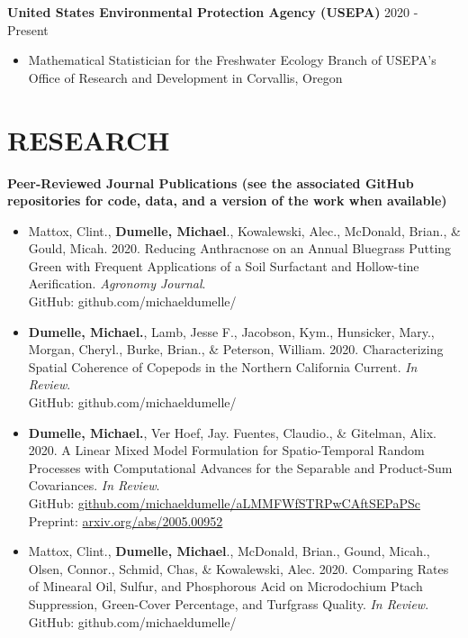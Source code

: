 \documentclass[line, margin, 10pt]{res}\usepackage[]{graphicx}\usepackage[]{color}
\begin{document}
\begin{resume}
\textbf{United States Environmental Protection Agency (USEPA)} \hfill 2020 - Present
\begin{itemize}
	\item Mathematical Statistician for the Freshwater Ecology Branch of USEPA's Office of Research and Development in Corvallis, Oregon
\end{itemize}

\section{RESEARCH}

\textbf{Peer-Reviewed Journal Publications (see the associated GitHub repositories for code, data, and a version of the work when available)}

\begin{itemize}
	
\item Mattox, Clint., \textbf{Dumelle, Michael}., Kowalewski, Alec., McDonald, Brian., \& Gould, Micah. 2020. Reducing Anthracnose on an Annual Bluegrass Putting Green with Frequent Applications of a Soil Surfactant and Hollow-tine Aerification. \emph{Agronomy Journal}. \\
GitHub: github.com/michaeldumelle/

\item \textbf{Dumelle, Michael.}, Lamb, Jesse F., Jacobson, Kym., Hunsicker, Mary., Morgan, Cheryl., Burke, Brian., \& Peterson, William. 2020. Characterizing Spatial Coherence of Copepods in the Northern California Current. \emph{In Review}. \\
 GitHub: github.com/michaeldumelle/

\item \textbf{Dumelle, Michael.}, Ver Hoef, Jay. Fuentes, Claudio., \& Gitelman, Alix. 2020. A Linear Mixed Model Formulation for Spatio-Temporal Random Processes with Computational Advances for the Separable and Product-Sum Covariances.  \emph{In Review}. \\ GitHub: \href{https://github.com/michaeldumelle/aLMMFWfSTRPwCAftSEPaPSc}{github.com/michaeldumelle/aLMMFWfSTRPwCAftSEPaPSc} \\
Preprint: \href{https://arxiv.org/abs/2005.00952}{arxiv.org/abs/2005.00952} 

\item Mattox, Clint., \textbf{Dumelle, Michael}., McDonald, Brian., Gound, Micah., Olsen, Connor., Schmid, Chas, \& Kowalewski, Alec. 2020. Comparing Rates of Minearal Oil, Sulfur, and Phosphorous Acid on Microdochium Ptach Suppression, Green-Cover Percentage, and Turfgrass Quality. \emph{In Review}. \\
GitHub: github.com/michaeldumelle/


\end{itemize}
\end{resume}
\end{document}
